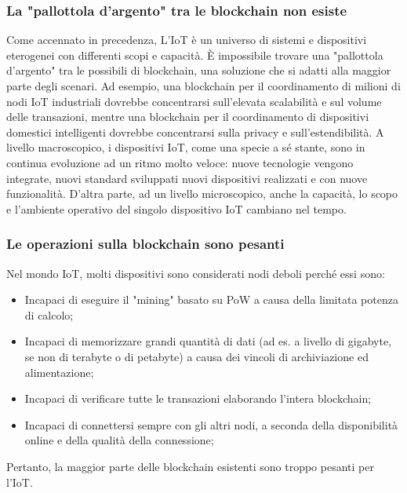 \documentclass[a4paper,12pt]{article}
\begin{document}
\subsubsection{La "pallottola d'argento" tra le blockchain non esiste}
Come accennato in precedenza, L'IoT è un universo di sistemi e dispositivi eterogenei con differenti scopi e capacità. È impossibile trovare una "pallottola d'argento" tra le possibili di blockchain, una soluzione che si adatti alla maggior parte degli scenari. Ad esempio, una blockchain per il coordinamento di milioni di nodi IoT industriali dovrebbe concentrarsi sull'elevata scalabilità e sul volume delle transazioni, mentre una blockchain per il coordinamento di dispositivi domestici intelligenti dovrebbe concentrarsi sulla privacy e sull'estendibilità. A livello macroscopico, i dispositivi IoT, come una specie a sé stante, sono in continua evoluzione ad un ritmo molto veloce: nuove tecnologie vengono integrate, nuovi standard sviluppati nuovi dispositivi realizzati e con nuove funzionalità. D'altra parte, ad un livello microscopico, anche la capacità, lo scopo e l'ambiente operativo del singolo dispositivo IoT cambiano nel tempo.

\subsubsection{Le operazioni sulla blockchain sono pesanti}
Nel mondo IoT, molti dispositivi sono considerati nodi deboli perché essi sono:
\begin{itemize}
	\item
	      Incapaci di eseguire il "mining" basato su PoW a causa della limitata potenza di calcolo;
	\item
	      Incapaci di memorizzare grandi quantità di dati (ad es. a livello di gigabyte, se non di terabyte o di petabyte) a causa dei vincoli di archiviazione ed alimentazione;
	\item
	      Incapaci di verificare tutte le transazioni elaborando l'intera blockchain;
	\item
	      Incapaci di connettersi sempre con gli altri nodi, a seconda della disponibilità online e della qualità della connessione;
\end{itemize}
Pertanto, la maggior parte delle blockchain esistenti sono troppo pesanti per l'IoT.
\end{document}
